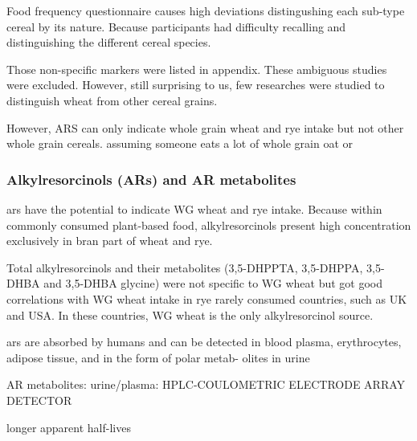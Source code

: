 Food frequency questionnaire causes high deviations distingushing each sub-type cereal by its nature. Because participants had difficulty recalling and distinguishing the different cereal species.

Those non-specific markers were listed in appendix. 
These ambiguous studies were excluded.
However, still surprising to us, few researches were studied to distinguish wheat from other cereal grains.

However, ARS can only indicate whole grain wheat and rye intake but not other whole grain cereals. assuming someone eats a lot of whole grain oat or 


\subsubsection{Alkylresorcinols (ARs) and AR metabolites}
\acrfull{ars} have the potential to indicate WG wheat and rye intake. 
Because within commonly consumed plant-based food, alkylresorcinols present high concentration exclusively in bran part of wheat and rye. 

Total alkylresorcinols and their metabolites (3,5-DHPPTA, 3,5-DHPPA, 3,5-DHBA and 3,5-DHBA glycine) were not specific to WG wheat but got good correlations with WG wheat intake in rye rarely consumed countries, such as UK and USA. In these countries, WG wheat is the only alkylresorcinol source.

\acrshort{ars} are absorbed by humans and can be detected in blood plasma, erythrocytes, adipose tissue\cite{ISI:000451002000016}, and in the form of polar metab- olites in urine

AR metabolites: urine/plasma: HPLC-COULOMETRIC ELECTRODE ARRAY DETECTOR

longer apparent half-lives

